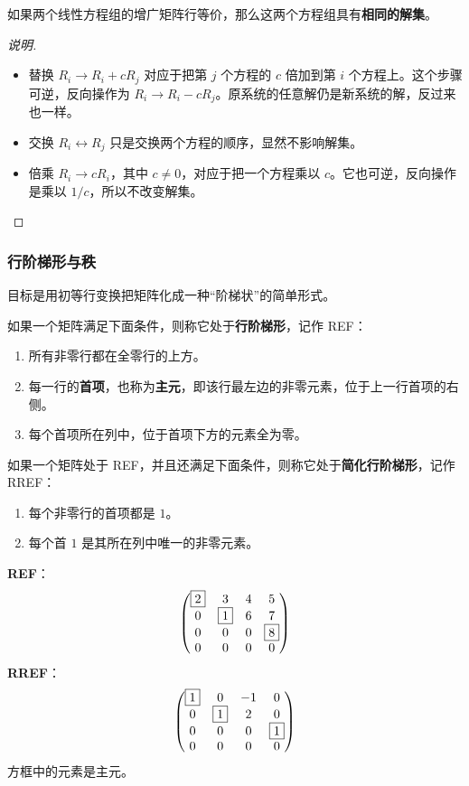 \begin{theorem}
如果两个线性方程组的增广矩阵行等价，那么这两个方程组具有\textbf{相同的解集}。
\end{theorem}
\begin{proof}[说明]
\begin{itemize}
    \item 替换 $R_i\to R_i+cR_j$ 对应于把第 $j$ 个方程的 $c$ 倍加到第 $i$ 个方程上。这个步骤可逆，反向操作为 $R_i\to R_i-cR_j$。原系统的任意解仍是新系统的解，反过来也一样。
    \item 交换 $R_i\leftrightarrow R_j$ 只是交换两个方程的顺序，显然不影响解集。
    \item 倍乘 $R_i\to cR_i$，其中 $c\neq0$，对应于把一个方程乘以 $c$。它也可逆，反向操作是乘以 $1/c$，所以不改变解集。
\end{itemize}
\end{proof}

\subsubsection{行阶梯形与秩}

目标是用初等行变换把矩阵化成一种“阶梯状”的简单形式。

\begin{definition}
如果一个矩阵满足下面条件，则称它处于\textbf{行阶梯形}，记作 REF：
\begin{enumerate}
    \item 所有非零行都在全零行的上方。
    \item 每一行的\textbf{首项}，也称为\textbf{主元}，即该行最左边的非零元素，位于上一行首项的右侧。
    \item 每个首项所在列中，位于首项下方的元素全为零。
\end{enumerate}
\end{definition}

\begin{definition}
如果一个矩阵处于 REF，并且还满足下面条件，则称它处于\textbf{简化行阶梯形}，记作 RREF：
\begin{enumerate}
    \item 每个非零行的首项都是 $1$。
    \item 每个首 $1$ 是其所在列中唯一的非零元素。
\end{enumerate}
\end{definition}

\begin{example}
\textbf{REF}：
\[ \begin{pmatrix} \fbox{2} & 3 & 4 & 5 \\ 0 & \fbox{1} & 6 & 7 \\ 0 & 0 & 0 & \fbox{8} \\ 0 & 0 & 0 & 0 \end{pmatrix} \]
\textbf{RREF}：
\[ \begin{pmatrix} \fbox{1} & 0 & -1 & 0 \\ 0 & \fbox{1} & 2 & 0 \\ 0 & 0 & 0 & \fbox{1} \\ 0 & 0 & 0 & 0 \end{pmatrix} \]
方框中的元素是主元。
\end{example}


